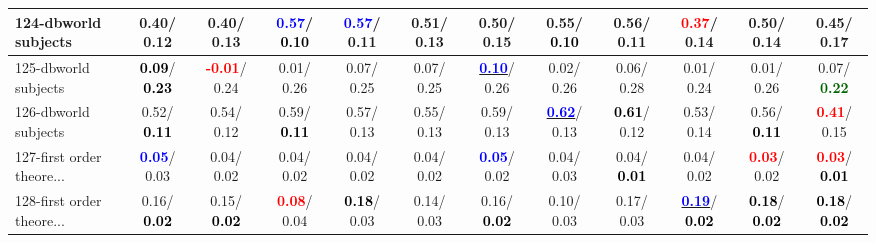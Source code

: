 \begin{table}[h]
\begin{center}
{\begin{tabular}{lc|c|c|c|c|c|c|c|c|c|c}
124-dbworld subjects &   0.40/  0.12 &   0.40/  0.13 & \textcolor{blue}{\textbf{  0.57}}/\textcolor{black}{\textbf{  0.10}} & \textcolor{blue}{\textbf{  0.57}}/  0.11 &   0.51/  0.13 &   0.50/  0.15 &   0.55/\textcolor{black}{\textbf{  0.10}} &   0.56/  0.11 & \textcolor{red}{\textbf{  0.37}}/  0.14 &   0.50/  0.14 &   0.45/  0.17 \\ \hline
125-dbworld subjects & \textcolor{black}{\textbf{  0.09}}/\textcolor{black}{\textbf{  0.23}} & \textcolor{red}{\textbf{ -0.01}}/  0.24 &   0.01/  0.26 &   0.07/  0.25 &   0.07/  0.25 & \underline{\textcolor{blue}{\textbf{  0.10}}}/  0.26 &   0.02/  0.26 &   0.06/  0.28 &   0.01/  0.24 &   0.01/  0.26 &   0.07/\textcolor{darkgreen}{\textbf{  0.22}} \\
126-dbworld subjects &   0.52/\textcolor{black}{\textbf{  0.11}} &   0.54/  0.12 &   0.59/\textcolor{black}{\textbf{  0.11}} &   0.57/  0.13 &   0.55/  0.13 &   0.59/  0.13 & \underline{\textcolor{blue}{\textbf{  0.62}}}/  0.13 & \textcolor{black}{\textbf{  0.61}}/  0.12 &   0.53/  0.14 &   0.56/\textcolor{black}{\textbf{  0.11}} & \textcolor{red}{\textbf{  0.41}}/  0.15 \\
127-first order theore... & \textcolor{blue}{\textbf{  0.05}}/  0.03 &   0.04/  0.02 &   0.04/  0.02 &   0.04/  0.02 &   0.04/  0.02 & \textcolor{blue}{\textbf{  0.05}}/  0.02 &   0.04/  0.03 &   0.04/\textcolor{black}{\textbf{  0.01}} &   0.04/  0.02 & \textcolor{red}{\textbf{  0.03}}/  0.02 & \textcolor{red}{\textbf{  0.03}}/\textcolor{black}{\textbf{  0.01}} \\
128-first order theore... &   0.16/\textcolor{black}{\textbf{  0.02}} &   0.15/\textcolor{black}{\textbf{  0.02}} & \textcolor{red}{\textbf{  0.08}}/  0.04 & \textcolor{black}{\textbf{  0.18}}/  0.03 &   0.14/  0.03 &   0.16/\textcolor{black}{\textbf{  0.02}} &   0.10/  0.03 &   0.17/  0.03 & \underline{\textcolor{blue}{\textbf{  0.19}}}/\textcolor{black}{\textbf{  0.02}} & \textcolor{black}{\textbf{  0.18}}/\textcolor{black}{\textbf{  0.02}} & \textcolor{black}{\textbf{  0.18}}/\textcolor{black}{\textbf{  0.02}} \\\end{tabular}}\label{stratsALCKappa3AllReduxa}
\end{center}
\end{table}
